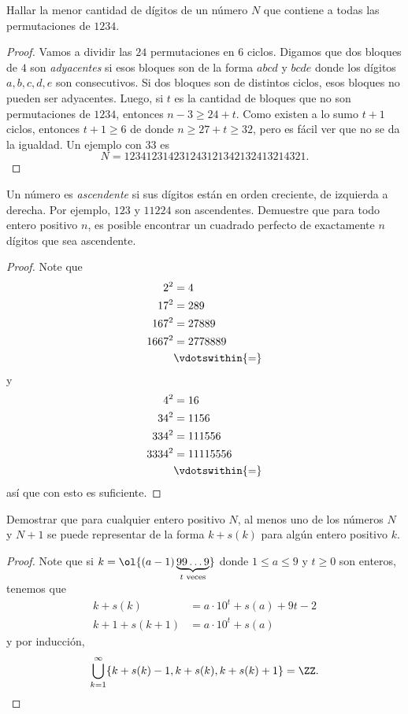 \begin{probEG}
	Hallar la menor cantidad de dígitos de un número $N$ que contiene a todas las permutaciones de $1234$.
\end{probEG}

\begin{proof}
	Vamos a dividir las $24$ permutaciones en $6$ ciclos. Digamos que dos bloques de $4$ son \emph{adyacentes} si esos bloques son de la forma $abcd$ y $bcde$ donde los dígitos $a,b,c,d,e$ son consecutivos. Si dos bloques son de distintos ciclos, esos bloques no pueden ser adyacentes. Luego, si $t$ es la cantidad de bloques que no son permutaciones de $1234$, entonces $n-3\ge 24+t$. Como existen a lo sumo $t+1$ ciclos, entonces $t+1\ge 6$ de donde $n\ge 27+t\ge 32$, pero es fácil ver que no se da la igualdad. Un ejemplo con $33$ es \[N=123412314231243121342132413214321.\]
\end{proof}

\begin{problem}
	Un número es \emph{ascendente} si sus dígitos están en orden creciente, de izquierda a derecha. Por ejemplo, $123$ y $11224$ son ascendentes. Demuestre que para todo entero positivo $n$, es posible encontrar un cuadrado perfecto de exactamente $n$ dígitos que sea ascendente.
\end{problem}

\begin{proof}
	Note que
	\begin{align*}
		2^2&=4\\
		17^2&=289\\
		167^2&=27889\\
		1667^2&=2778889\\
		&\vdotswithin{=}
	\end{align*}
	y
	\begin{align*}
		4^2&=16\\
		34^2&=1156\\
		334^2&=111556\\
		3334^2&=11115556\\
		&\vdotswithin{=}
	\end{align*}
	así que con esto es suficiente.
\end{proof}

\begin{problem}
	Demostrar que para cualquier entero positivo $N$, al menos uno de los números $N$ y $N+1$ se puede representar de la forma $k+s(k)$ para algún entero positivo $k$.
\end{problem}

\begin{proof}
	Note que si $k=\ol{(a-1)\underbrace{99\dots 9}_{t\text{ veces}}}$ donde $1\le a\le 9$ y $t\ge 0$ son enteros, tenemos que
	\begin{align*}
		k+s(k)&=a\cdot 10^t+s(a)+9t-2\\
		k+1+s(k+1)&=a\cdot 10^t+s(a)
	\end{align*}
	y por inducción,
	\[\bigcup_{k=1}^\infty\{k+s(k)-1,k+s(k),k+s(k)+1\}=\ZZ.\]
\end{proof}
